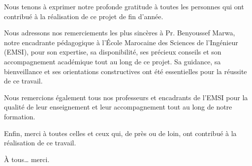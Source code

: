 \setlength{\parskip}{1em}
Nous tenons à exprimer notre profonde gratitude à toutes les personnes qui ont contribué à la réalisation de ce projet de fin d'année.

Nous adressons nos remerciements les plus sincères à Pr. Benyoussef Marwa, notre encadrante pédagogique à l'École Marocaine des Sciences de l'Ingénieur (EMSI), pour son expertise, sa disponibilité, ses précieux conseils et son accompagnement académique tout au long de ce projet. Sa guidance, sa bienveillance et ses orientations constructives ont été essentielles pour la réussite de ce travail.

Nous remercions également tous nos professeurs et encadrants de l'EMSI pour la qualité de leur enseignement et leur accompagnement tout au long de notre formation.

Enfin, merci à toutes celles et ceux qui, de près ou de loin, ont contribué à la réalisation de ce travail.

À tous… merci.